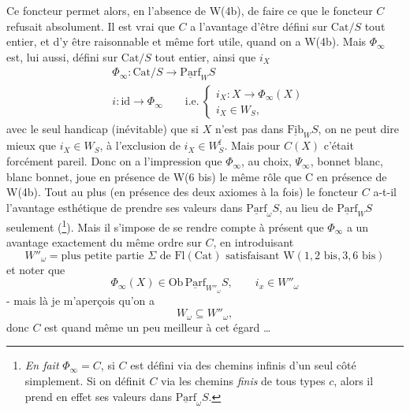 \documentclass[11pt]{article}
\newcommand{\printedpage}[1]{\marginpar{\footnotesize p.~#1}}
\newcommand{\msp}[1]{\marginpar{\footnotesize [#1]}}
\newcommand{\und}[1]{\underline{\mathrm{#1}}}
\begin{document}
Ce foncteur permet alors, en l'absence de W(4b), de faire ce que le foncteur $C$ refusait absolument. Il est vrai que $C$ a l'avantage d'être défini sur $\mathrm{Cat}/S$ tout entier, et d'y être
\printedpage{120}
raisonnable et même fort utile, quand on a W(4b). Mais $\Phi_\infty$ est, lui aussi, défini sur $\mathrm{Cat}/S$ tout entier, ainsi que $i_X$
\[
\begin{aligned}
&\Phi_\infty : \mathrm{Cat}/S \longrightarrow \und{Parf}_W S\\
&i : \mathrm{id} \longrightarrow \Phi_\infty \qquad \text{i.e.}\ \begin{cases} i_X : X \longrightarrow \Phi_\infty(X)\\ i_X \in W_S, \end{cases}
\end{aligned}
\]
avec le seul handicap (inévitable) que si $X$ n'est pas dans $\und{Fib}_W S$, on ne peut dire mieux que $i_X \in W_S$, à l'exclusion de $i_X \in W_S^{\mathrm{f}}$. Mais pour $C(X)$ c'était forcément pareil. Donc on a l'impression que $\Phi_\infty$, au choix, $\Psi_\infty$, bonnet blanc, blanc bonnet, joue en présence de W(6 bis) le même rôle que C en présence de W(4b). Tout au plus (en présence des deux axiomes à la fois) le foncteur $C$ a-t-il l'avantage esthétique de prendre ses valeurs dans $\und{Parf}_\omega S$, au lieu de $\und{Parf}_W S$ seulement (\footnote[93]{\textit{En fait} $\Phi_\infty = C$, si $C$ est défini via des chemins infinis d'un seul côté simplement. Si on définit $C$ via les chemins \textit{finis} de tous types $c$, alors il prend en effet ses valeurs dans $\und{Parf}_\omega S$.}). Mais il s'impose de %
\msp{page 195}
se rendre compte à présent que $\Phi_\infty$ a un avantage exactement du même ordre sur $C$, en introduisant
\[
W''_\omega = \text{plus petite partie } \Sigma \text{ de } \mathrm{Fl}(\mathrm{Cat}) \text{ satisfaisant } \mathrm{W}(1, 2\text{ bis}, 3, 6\text{ bis})
\]
et noter que
\[
\Phi_\infty(X) \in \mathrm{Ob}\,\und{Parf}_{W''_\omega} S, \qquad i_x \in W''_\omega %
\]
- mais là je m'aperçois qu'on a
\[
W_\omega \subseteq W''_\omega,
\]
donc $C$ est quand même un peu meilleur à cet égard \ldots
\end{document}
